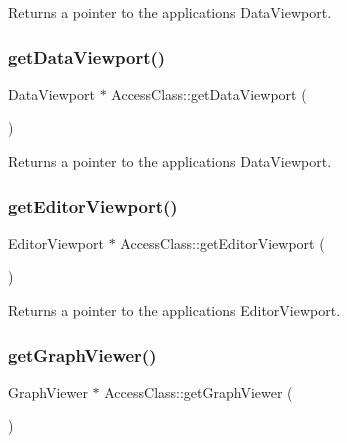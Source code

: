 Returns a pointer to the application\textquotesingle{}s Data\+Viewport. \mbox{\label{namespace_access_class_af26919b327fd17cb4a3ed79623f8795f}} 
\subsubsection{\texorpdfstring{get\+Data\+Viewport()}{getDataViewport()}}
{\footnotesize\ttfamily Data\+Viewport $\ast$ Access\+Class\+::get\+Data\+Viewport (\begin{DoxyParamCaption}{ }\end{DoxyParamCaption})}

Returns a pointer to the application\textquotesingle{}s Data\+Viewport. \mbox{\label{namespace_access_class_a53ff876e8fae76efe1766a3c6b5defc8}} 
\subsubsection{\texorpdfstring{get\+Editor\+Viewport()}{getEditorViewport()}}
{\footnotesize\ttfamily Editor\+Viewport $\ast$ Access\+Class\+::get\+Editor\+Viewport (\begin{DoxyParamCaption}{ }\end{DoxyParamCaption})}

Returns a pointer to the application\textquotesingle{}s Editor\+Viewport. \mbox{\label{namespace_access_class_a45a325e053c7e866aab251efa1d91008}} 
\subsubsection{\texorpdfstring{get\+Graph\+Viewer()}{getGraphViewer()}}
{\footnotesize\ttfamily Graph\+Viewer $\ast$ Access\+Class\+::get\+Graph\+Viewer (\begin{DoxyParamCaption}{ }\end{DoxyParamCaption})}

